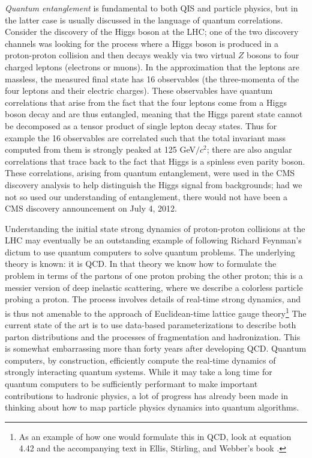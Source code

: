 \documentclass[a4paper,11pt]{article}
\begin{document}
{\it Quantum entanglement} is fundamental to both QIS and particle physics, but in the latter case is usually discussed in the language of quantum correlations.
Consider the discovery of the Higgs boson at the LHC; one of the two discovery channels was looking for the process where a Higgs boson is produced in a
proton-proton collision and then decays weakly via two virtual $Z$ bosons to four charged leptons (electrons or muons). In the approximation that the leptons
are massless, the measured final state has 16 observables (the three-momenta of the four leptons and their electric charges). These observables have quantum correlations that arise
from the fact that the four leptons come from a Higgs boson decay and are thus entangled, meaning that the Higgs parent state cannot be decomposed as a
tensor product of single lepton decay states. Thus for example the 16 observables are correlated such that the total invariant mass computed from them is
strongly peaked at 125 GeV$/c^2$; there are also angular correlations that trace back to the fact that Higgs is a spinless even parity boson.
These correlations, arising from quantum entanglement, were used in the CMS discovery analysis to help distinguish the Higgs signal from backgrounds;
had we not so used our understanding of entanglement, there would not have been a CMS discovery announcement on July 4, 2012.

Understanding the initial state strong dynamics of proton-proton collisions at the LHC may eventually be an outstanding example of following
Richard Feynman's dictum to use quantum computers to solve quantum problems. The underlying theory is known: it is QCD. In that theory we
know how to formulate the problem in terms of the partons of one proton probing the other proton; this is a messier version of deep inelastic
scattering, where we describe a colorless particle probing a proton. The process involves details of real-time strong dynamics, and is thus not amenable to
the approach of Euclidean-time lattice gauge theory\footnote{As an example of how one would formulate this in QCD, look at equation 4.42 and the
accompanying text in Ellis, Stirling, and Webber's book \cite{Ellis:1991qj}.}
The current state of the art is to use data-based parameterizations to describe both parton
distributions and the processes of fragmentation and hadronization. This is somewhat embarrassing more than forty years after developing QCD.
Quantum computers, by construction, efficiently compute the real-time dynamics of strongly interacting quantum systems. While it may take a long time
for quantum computers to be sufficiently performant to make important contributions to hadronic physics, a lot of progress has already been made in
thinking about how to map particle physics dynamics into quantum algorithms.
\end{document}
